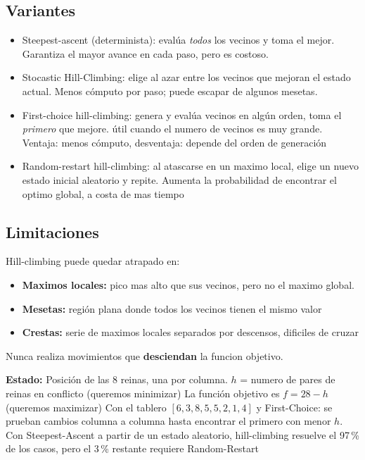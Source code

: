 \subsection{Variantes}
\begin{itemize}
    \item Steepest-ascent (determinista): evalúa \emph{todos} los vecinos y toma el mejor. Garantiza el mayor avance en cada paso, pero es costoso.
    \item Stocastic Hill-Climbing: elige al azar entre los vecinos que mejoran el estado actual. Menos cómputo por paso; puede escapar de algunos mesetas.
    \item First-choice hill-climbing: genera y evalúa vecinos en algún orden, toma el \emph{primero} que mejore. útil cuando el numero de vecinos es muy grande. Ventaja: menos cómputo, desventaja: depende del orden de generación
    \item Random-restart hill-climbing: al atascarse en un maximo local, elige un nuevo estado inicial aleatorio y repite. Aumenta la probabilidad de encontrar el optimo global, a costa de mas tiempo

\end{itemize}

\subsection{Limitaciones}
\begin{theorem}
    Hill-climbing puede quedar atrapado en:
    \begin{itemize}
        \item \textbf{Maximos locales:} pico mas alto que sus vecinos, pero no el maximo global.
        \item \textbf{Mesetas:} región plana donde todos los vecinos tienen el mismo valor
        \item \textbf{Crestas:} serie de maximos locales separados por descensos, dificiles de cruzar
    \end{itemize}
    Nunca realiza movimientos que \textbf{desciendan} la funcion objetivo.
    
\end{theorem}

\begin{example}
    \textbf{Estado:} Posición de las 8 reinas, una por columna.
    $h$ = numero de pares de reinas en conflicto (queremos minimizar)
    La función objetivo es $f = 28 -h$ (queremos maximizar)
    \medskip
    Con el tablero $[6,3,8,5,5,2,1,4]$ y First-Choice: se prueban cambios columna a columna hasta encontrar el primero con menor $h$.
    \medskip
    Con Steepest-Ascent a partir de un estado aleatorio, hill-climbing resuelve el 97\,\% de los casos, pero el 3\,\% restante requiere Random-Restart
    
\end{example}

